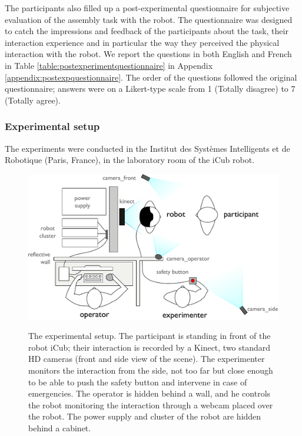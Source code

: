 The participants also filled up a post-experimental questionnaire for subjective evaluation of the assembly task with the robot.
The questionnaire was designed to catch the impressions and feedback of the participants about the task, their interaction experience and in particular the way they perceived the physical interaction with the robot. 
We report the questions in both English and French in Table \ref{table:postexperimentquestionnaire} in Appendix \ref{appendix:postexpquestionnaire}. 
The order of the questions followed the original questionnaire; answers were on a Likert-type scale from 1 (Totally disagree) to 7 (Totally agree). 




\subsubsection{Experimental setup}\label{sec:experimentalsetting}

The experiments were conducted in the Institut des Systèmes Intelligents et de Robotique (Paris, France), in the laboratory room of the iCub robot. 

\begin{figure}[ht!]
	\centering
	{
		\includegraphics[width=0.7\hsize]{Serena/figures/expe-setting.pdf}
	}
	\caption{The experimental setup. The participant is standing in front of the robot iCub; their interaction is recorded by a Kinect, two standard HD cameras (front and side view of the scene). The experimenter monitors the interaction from the side, not too far but close enough to be able to push the safety button and intervene in case of emergencies. The operator is hidden behind a wall, and he controls the robot monitoring the interaction through a webcam placed over the robot. The power supply and cluster of the robot are hidden behind a cabinet.}
	\label{fig:setup}
\end{figure}

